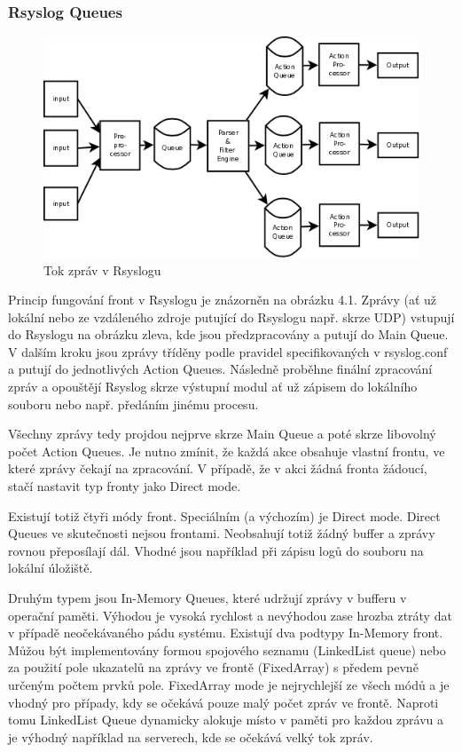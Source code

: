\documentclass[thesis=B,czech]{FITthesis}[2012/06/26]
\begin{document}
\subsubsection*{Rsyslog Queues}

\begin{figure}[ht]
	\centering
	\includegraphics[scale=0.4]{images/rsyslog-queues}
	\caption[Tok zpráv v Rsyslogu]{Tok zpráv v Rsyslogu~\cite{RsyslogQueues}}
\end{figure}

Princip fungování front v Rsyslogu je znázorněn na obrázku 4.1. Zprávy (ať už lokální nebo ze vzdáleného zdroje putující do Rsyslogu např. skrze UDP) vstupují do Rsyslogu  na obrázku zleva, kde jsou předzpracovány a putují do Main Queue. V dalším kroku jsou zprávy tříděny podle pravidel specifikovaných v rsyslog.conf a putují do jednotlivých Action Queues. Následně proběhne finální zpracování zpráv a opouštějí Rsyslog skrze výstupní modul ať už zápisem do lokálního souboru nebo např. předáním jinému procesu.

Všechny zprávy tedy projdou nejprve skrze Main Queue a poté skrze libovolný počet Action Queues. Je nutno zmínit, že každá akce obsahuje vlastní frontu, ve které zprávy čekají na zpracování. V případě, že v akci žádná fronta žádoucí, stačí nastavit typ fronty jako Direct mode.

Existují totiž čtyři módy front. Speciálním (a výchozím) je Direct mode. Direct Queues ve skutečnosti nejsou frontami. Neobsahují totiž žádný buffer a zprávy rovnou přeposílají dál. Vhodné jsou například při zápisu logů do souboru na lokální úložiště.

Druhým typem jsou In-Memory Queues, které udržují zprávy v bufferu v operační paměti. Výhodou je vysoká rychlost a nevýhodou zase hrozba ztráty dat v případě neočekávaného pádu systému.
Existují dva podtypy In-Memory front. Můžou být implementovány formou spojového seznamu (LinkedList queue) nebo za použití pole ukazatelů na zprávy ve frontě (FixedArray) s předem pevně určeným počtem prvků pole. FixedArray mode je nejrychlejší ze všech módů a je vhodný pro případy, kdy se očekává pouze malý počet zpráv ve frontě. Naproti tomu LinkedList Queue dynamicky alokuje místo v paměti pro každou zprávu a je výhodný například na serverech, kde se očekává velký tok zpráv.
\end{document}
